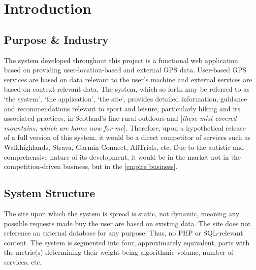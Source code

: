 \documentclass[11pt, english]{article}
\begin{document}
\newpage

	\renewcommand{\contentsname}{Table of Contents}

	\tableofcontents

\newpage

	\listoftables

\newpage

	\listoffigures

\newpage


\section{Introduction}\label{ch1}

	\subsection{Purpose \& Industry}

	The system developed throughout this project is a functional web application based on providing user-location-based and external GPS data. User-based GPS services are based on data relevant to the user's machine and external services are based on context-relevant data. The system, which so forth may be referred to as `the system', `the application', `the site', provides detailed information, guidance and recommendations relevant to sport and leisure, particularly hiking and its associated practices, in Scotland's fine rural outdoors and [\textit{these mist covered mountains, which are home now for me}]. Therefore, upon a hypothetical release of a full version of this system, it would be a direct competitor of services such as Walkhighlands, Strava, Garmin Connect, AllTrials, etc. Due to the autistic and comprehensive nature of its development, it would be in the market not in the competition-driven business, but in the [\href{https://youtu.be/c18_Thy6kJo?t=204}{empire business}].

	\subsection{System Structure}

	The site upon which the system is spread is static, not dynamic, meaning any possible requests made buy the user are based on existing data. The site does not reference an external database for any purpose. Thus, no PHP or SQL-relevant content. The system is segmented into four, approximately equivalent, parts with the metric(s) determining their weight being algorithmic volume, number of services, etc.\\
\end{document}
